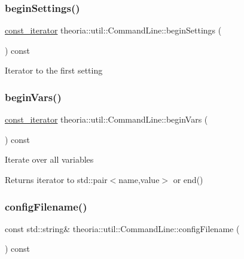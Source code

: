 \subsubsection{\texorpdfstring{begin\+Settings()}{beginSettings()}}
{\footnotesize\ttfamily \hyperlink{classtheoria_1_1util_1_1CommandLine_a729aa00feedd8257d4caafc73ac6ee63}{const\+\_\+iterator} theoria\+::util\+::\+Command\+Line\+::begin\+Settings (\begin{DoxyParamCaption}{ }\end{DoxyParamCaption}) const\hspace{0.3cm}{\ttfamily [inline]}}

Iterator to the first setting \mbox{\label{classtheoria_1_1util_1_1CommandLine_a65446583fe4fe7d3a9ae1ed4dd23185e}} 
\subsubsection{\texorpdfstring{begin\+Vars()}{beginVars()}}
{\footnotesize\ttfamily \hyperlink{classtheoria_1_1util_1_1CommandLine_a729aa00feedd8257d4caafc73ac6ee63}{const\+\_\+iterator} theoria\+::util\+::\+Command\+Line\+::begin\+Vars (\begin{DoxyParamCaption}{ }\end{DoxyParamCaption}) const\hspace{0.3cm}{\ttfamily [inline]}}

Iterate over all variables \begin{DoxyReturn}{Returns}
iterator to std\+::pair$<$name,value$>$ or end() 
\end{DoxyReturn}
\mbox{\label{classtheoria_1_1util_1_1CommandLine_abac7c59a7bf3989959f0023455f3257e}} 
\subsubsection{\texorpdfstring{config\+Filename()}{configFilename()}}
{\footnotesize\ttfamily const std\+::string\& theoria\+::util\+::\+Command\+Line\+::config\+Filename (\begin{DoxyParamCaption}{ }\end{DoxyParamCaption}) const\hspace{0.3cm}{\ttfamily [inline]}}


